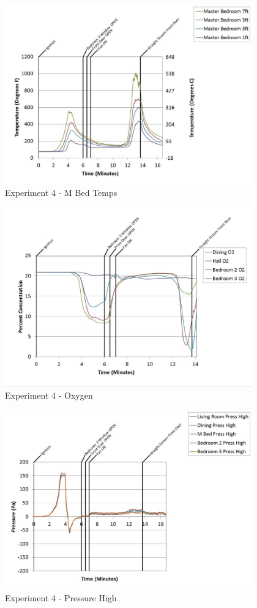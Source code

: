 \documentclass{article}
\begin{document}
\begin{appendices}
	\begin{figure}[h!]
		\centering
		\includegraphics[height=3.05in]{0_Images/Results_Charts/Exp_4_Charts/MBedTemps.pdf}
		\caption{Experiment 4 - M Bed Temps}
	\end{figure}
 
	\clearpage

	\begin{figure}[h!]
		\centering
		\includegraphics[height=3.05in]{0_Images/Results_Charts/Exp_4_Charts/Oxygen.pdf}
		\caption{Experiment 4 - Oxygen}
	\end{figure}
 

	\begin{figure}[h!]
		\centering
		\includegraphics[height=3.05in]{0_Images/Results_Charts/Exp_4_Charts/PressureHigh.pdf}
		\caption{Experiment 4 - Pressure High}
	\end{figure}
 

\end{appendices}
\end{document}
